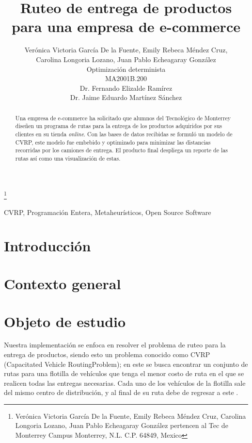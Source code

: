 \documentclass[journal]{IEEEtran}
\title{\LARGE \bf Ruteo de entrega de productos para una empresa de e-commerce}
\author{Verónica Victoria García De la Fuente, Emily Rebeca Méndez Cruz, \\Carolina Longoria Lozano, Juan Pablo Echeagaray González \\
Optimización determinista \\
MA2001B.200 \\
Dr. Fernando Elizalde Ramírez \\
Dr. Jaime Eduardo Martínez Sánchez}%
\begin{document}
    \thanks{Verónica Victoria García De la Fuente, Emily Rebeca Méndez Cruz, Carolina Longoria Lozano, Juan Pablo Echeagaray González pertencen al Tec de Monterrey Campus Monterrey, N.L. C.P. 64849, Mexico {\tt\small}}

    \maketitle

    \thispagestyle{empty}
    \pagestyle{empty}

    \begin{abstract}
        Una empresa de e-commerce ha solicitado que alumnos del Tecnológico de Monterrey diseñen un programa de rutas para la entrega de los productos adquiridos por sus clientes en su tienda \emph{online}. Con las bases de datos recibidas se formuló un modelo de CVRP, este modelo fue embebido y optimizado para minimizar las distancias recorridas por los camiones de entrega. El producto final despliega un reporte de las rutas así como una visualización de estas.
    \end{abstract}

    \begin{IEEEkeywords} 
        CVRP, Programación Entera, Metaheurísticos, Open Source Software
    \end{IEEEkeywords}

    \section{Introducción} \label{sec:intro} %

    \section{Contexto general} \label{sec:general-context}
        
    \section{Objeto de estudio} \label{sec:case-study}

        Nuestra implementación se enfoca en resolver el problema de ruteo para la entrega de productos, siendo esto un problema conocido como CVRP (Capacitated Vehicle RoutingProblem); en este se busca encontrar un conjunto de rutas para una flotilla de vehículos que tenga el menor costo de ruta en el que se realicen todas las entregas necesarias. Cada uno de los vehículos de la flotilla sale del mismo centro de distribución, y al final de su ruta debe de regresar a este \cite{elshaer2020taxonomic}.
\end{document}
